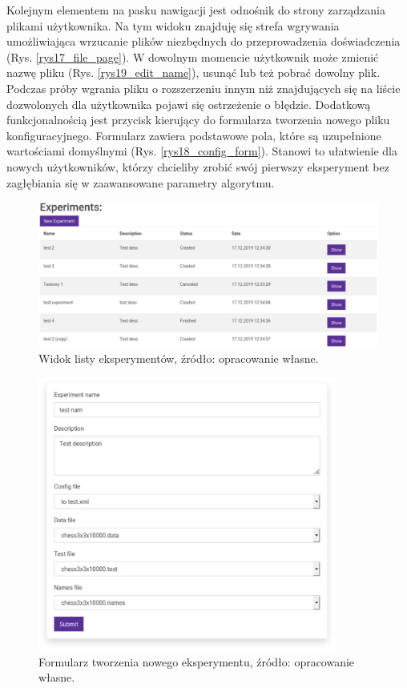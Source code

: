 Kolejnym elementem na pasku nawigacji jest odnośnik do strony zarządzania plikami użytkownika. Na tym widoku znajduję się strefa wgrywania umożliwiająca wrzucanie plików niezbędnych do przeprowadzenia doświadczenia (Rys. \ref{rys17_file_page}). W dowolnym momencie użytkownik może zmienić nazwę pliku (Rys. \ref{rys19_edit_name}), usunąć lub też pobrać dowolny plik. Podczas próby wgrania pliku o rozszerzeniu innym niż znajdujących się na liście dozwolonych dla użytkownika pojawi się ostrzeżenie o błędzie. Dodatkową funkcjonalnością jest przycisk kierujący do formularza tworzenia nowego pliku konfiguracyjnego. Formularz zawiera podstawowe pola, które są uzupełnione wartościami domyślnymi (Rys. \ref{rys18_config_form}). Stanowi to ułatwienie dla nowych użytkowników, którzy chcieliby zrobić swój pierwszy eksperyment bez zagłębiania się w zaawansowane parametry algorytmu.
\begin{figure}[htb]
	\centering
	\includegraphics[width=15cm]{grafika/experiment_table.eps}
	\caption{Widok listy eksperymentów, źródło: opracowanie własne.}
	\label{rys10_experiment_table}
\end{figure}

\begin{figure}[htb]
	\centering
	\includegraphics[height=9cm]{grafika/experiment_form.eps}
	\caption{Formularz tworzenia nowego eksperymentu, źródło: opracowanie własne.}
	\label{rys11_experiment_form}
\end{figure}



